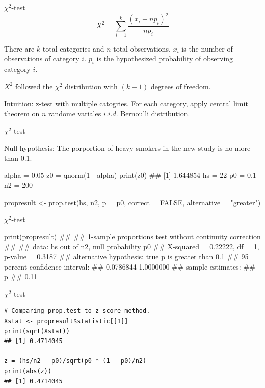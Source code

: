\documentclass[12pt, t, xcolor=dvipsnames]{beamer}
\begin{document}
\begin{frame}[fragile]{$\chi^2$-test}
$$X^2 = \sum_{i=1}^{k}\frac{(x_i - n p_i)^2}{n p_i}$$

There are $k$ total categories and $n$ total observations. $x_i$ is the number of observations of category $i$. $p_i$ is the hypothesized probability of observing category $i$. 

$X^{2}$ followed the $\chi^{2}$ distribution with $(k-1)$ degrees of freedom.
 
Intuition: z-test with multiple catogries. For each category, apply central limit theorem on $n$ randome variales $i.i.d.$ Bernoulli distribution.

\end{frame}

\begin{frame}[fragile]{$\chi^2$-test}

Null hypothesis: The porportion of heavy smokers in the new study is no more than 0.1. 

\begin{Rcode}
alpha = 0.05
z0 = qnorm(1 - alpha)
print(z0)
## [1] 1.644854
hs = 22
p0 = 0.1
n2 = 200

propresult <- prop.test(hs, n2, p = p0, correct = FALSE, 
                        alternative = "greater")
\end{Rcode}
\end{frame}

\begin{frame}[fragile]{$\chi^2$-test}

\begin{Rcode}
print(propresult)
## 
##  1-sample proportions test without continuity correction
## 
## data:  hs out of n2, null probability p0
## X-squared = 0.22222, df = 1, p-value = 0.3187
## alternative hypothesis: true p is greater than 0.1
## 95 percent confidence interval:
##  0.0786844 1.0000000
## sample estimates:
##    p 
## 0.11
\end{Rcode}
\end{frame}

\begin{frame}[fragile]{$\chi^2$-test}

\begin{verbatim}
# Comparing prop.test to z-score method.
Xstat <- propresult$statistic[[1]]
print(sqrt(Xstat))
## [1] 0.4714045

z = (hs/n2 - p0)/sqrt(p0 * (1 - p0)/n2)
print(abs(z))
## [1] 0.4714045
\end{verbatim}

\end{frame}
\end{document}
